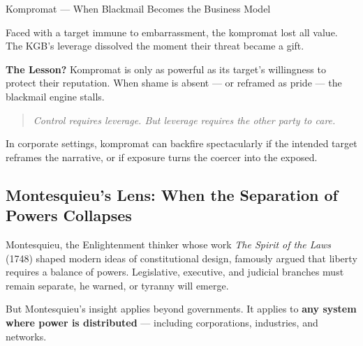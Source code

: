 \begin{HistoricalSidebar}{Kompromat --- When Blackmail Becomes the Business Model}
    \medskip
    
    Faced with a target immune to embarrassment, the kompromat lost all value.  
    The KGB’s leverage dissolved the moment their threat became a gift.
    
    \medskip
    
    \textbf{The Lesson?}  
    Kompromat is only as powerful as its target’s willingness to protect their reputation.  
    When shame is absent --- or reframed as pride --- the blackmail engine stalls.
    
    \begin{quote}
    \textit{Control requires leverage. But leverage requires the other party to care.}
    \end{quote}
    
    In corporate settings, kompromat can backfire spectacularly if the intended target reframes the narrative, or if exposure turns the coercer into the exposed.
    
\end{HistoricalSidebar}


\subsection{Montesquieu's Lens: When the Separation of Powers Collapses}

Montesquieu, the Enlightenment thinker whose work \textit{The Spirit of the Laws} (1748) shaped modern ideas of constitutional design, famously argued that liberty requires a balance of powers. Legislative, executive, and judicial branches must remain separate, he warned, or tyranny will emerge.

\medskip

But Montesquieu's insight applies beyond governments. It applies to \textbf{any system where power is distributed} — including corporations, industries, and networks.

